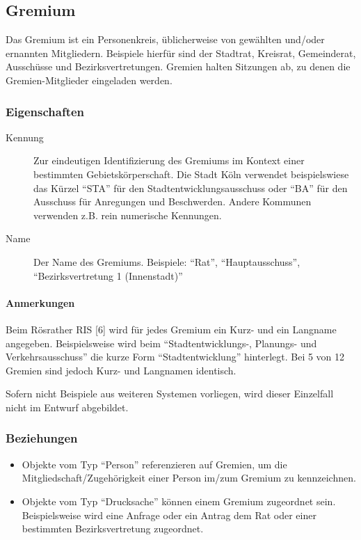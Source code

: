 \subsection{Gremium}

Das Gremium ist ein Personenkreis, üblicherweise von gewählten und/oder
ernannten Mitgliedern. Beispiele hierfür sind der Stadtrat, Kreisrat,
Gemeinderat, Ausschüsse und Bezirksvertretungen. Gremien halten
Sitzungen ab, zu denen die Gremien-Mitglieder eingeladen werden.

\subsubsection{Eigenschaften}

\begin{description}
\item[Kennung]
Zur eindeutigen Identifizierung des Gremiums im Kontext einer bestimmten
Gebietskörperschaft. Die Stadt Köln verwendet beispielswiese das Kürzel
``STA'' für den Stadtentwicklungsausschuss oder ``BA'' für den Ausschuss
für Anregungen und Beschwerden. Andere Kommunen verwenden z.B. rein
numerische Kennungen.
\item[Name]
Der Name des Gremiums. Beispiele: ``Rat'', ``Hauptausschuss'',
``Bezirksvertretung 1 (Innenstadt)''
\end{description}

\paragraph{Anmerkungen}

Beim Rösrather RIS {[}6{]} wird für jedes Gremium ein Kurz- und ein
Langname angegeben. Beispielsweise wird beim ``Stadtentwicklungs-,
Planungs- und Verkehrsausschuss'' die kurze Form ``Stadtentwicklung''
hinterlegt. Bei 5 von 12 Gremien sind jedoch Kurz- und Langnamen
identisch.

Sofern nicht Beispiele aus weiteren Systemen vorliegen, wird dieser
Einzelfall nicht im Entwurf abgebildet.

\subsubsection{Beziehungen}

\begin{itemize}
\item
  Objekte vom Typ ``Person'' referenzieren auf Gremien, um die
  Mitgliedschaft/Zugehörigkeit einer Person im/zum Gremium zu
  kennzeichnen.
\item
  Objekte vom Typ ``Drucksache'' können einem Gremium zugeordnet sein.
  Beispielsweise wird eine Anfrage oder ein Antrag dem Rat oder einer
  bestimmten Bezirksvertretung zugeordnet.
\end{itemize}


